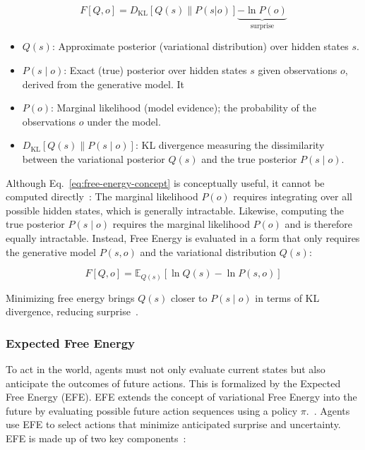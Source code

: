 \begin{equation}
F\left[Q, o\right] = D_\mathrm{KL}[Q(s) \parallel P(s|o)] \underbrace{ - \ln P(o)}_{\text{surprise}}  
\label{eq:free-energy-concept}
\end{equation}

\begin{itemize}
  \item \( Q(s) \): Approximate posterior (variational distribution) over hidden states \(s\).
  \item \( P(s \mid o) \): Exact (true) posterior over hidden states  \(s\) given observations \(o\), derived from the generative model. It 
  \item \( P(o) \): Marginal likelihood (model evidence); the probability of the observations \(o\) under the  model.
  \item \( D_\mathrm{KL}\left[ Q(s) \parallel P(s \mid o) \right] \): KL divergence measuring the dissimilarity between the variational posterior \( Q(s) \) and the true posterior \( P(s \mid o) \).
\end{itemize}

Although Eq.~\ref{eq:free-energy-concept} is conceptually useful, it cannot be computed directly~\cite{smith_step-by-step_2022}: The marginal likelihood \( P(o) \) requires integrating over all possible hidden states, which is generally intractable. Likewise, computing the true posterior \( P(s \mid o) \) requires the marginal likelihood \( P(o) \) and is therefore equally intractable. Instead, Free Energy is evaluated in a form that only requires the generative model \( P(s, o) \) and the variational distribution \( Q(s) \):

\begin{equation}
F[Q, o] = \mathbb{E}_{Q(s)}[\ln Q(s) - \ln P(s, o)]
\label{eq:free-energy-computation}
\end{equation}

Minimizing free energy brings \( Q(s) \) closer to \( P(s \mid o) \) in terms of KL divergence, reducing surprise~\cite{smith_step-by-step_2022}.



\subsubsection{Expected Free Energy}
To act in the world, agents must not only evaluate current states but also anticipate the outcomes of future actions. This is formalized by the Expected Free Energy (EFE). EFE extends the concept of variational Free Energy into the future by evaluating possible future action sequences using a policy \(\pi\).~\cite{friston_active_2016}. Agents use EFE to select actions that minimize anticipated surprise and uncertainty. EFE is made up of two key components~\cite{parr_active_2022}:

